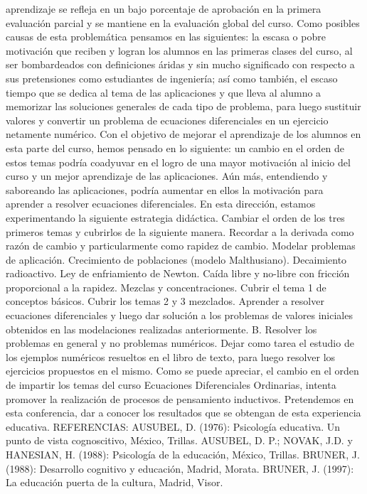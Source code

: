 aprendizaje se refleja en un bajo porcentaje de aprobación en la primera evaluación parcial y se mantiene en la evaluación global del curso. Como posibles causas de esta problemática pensamos en las siguientes: la escasa o pobre motivación que reciben y logran los alumnos en las primeras clases del curso, al ser bombardeados con definiciones áridas y sin mucho significado con respecto a sus pretensiones como estudiantes de ingeniería; así como también, el escaso tiempo que se dedica al tema de las aplicaciones y que lleva al alumno a memorizar las soluciones generales de cada tipo de problema, para luego sustituir valores y convertir un problema de ecuaciones diferenciales en un ejercicio netamente numérico. Con el objetivo de mejorar el aprendizaje de los alumnos en esta parte del curso, hemos pensado en lo siguiente: un cambio en el orden de estos temas podría coadyuvar en el logro de una mayor motivación al inicio del curso y un mejor aprendizaje de las aplicaciones. Aún más, entendiendo y saboreando las aplicaciones, podría aumentar en ellos la motivación para aprender a resolver ecuaciones diferenciales. En esta dirección, estamos experimentando la siguiente estrategia didáctica. Cambiar el orden de los tres primeros temas y cubrirlos de la siguiente manera.  Recordar a la derivada como razón de cambio y particularmente como rapidez de cambio. Modelar problemas de aplicación. Crecimiento de poblaciones (modelo Malthusiano). Decaimiento radioactivo. Ley de enfriamiento de Newton. Caída libre y no-libre con fricción proporcional a la rapidez. Mezclas y concentraciones. Cubrir el tema 1 de conceptos básicos. Cubrir los temas 2 y 3 mezclados. Aprender a resolver ecuaciones diferenciales y luego dar solución a los problemas de valores iniciales obtenidos en las modelaciones realizadas anteriormente. B. Resolver los problemas en general y no problemas numéricos. Dejar como tarea el estudio de los ejemplos numéricos resueltos en el libro de texto, para luego resolver los ejercicios propuestos en el mismo. Como se puede apreciar, el cambio en el orden de impartir los temas del curso Ecuaciones Diferenciales Ordinarias, intenta promover la realización de procesos de pensamiento inductivos. Pretendemos en esta conferencia, dar a conocer los resultados que se obtengan de esta experiencia educativa.   REFERENCIAS: AUSUBEL, D. (1976): Psicología educativa. Un punto de   vista cognoscitivo, México, Trillas. AUSUBEL, D. P.; NOVAK, J.D. y HANESIAN, H. (1988):   Psicología de la educación, México, Trillas. BRUNER, J. (1988): Desarrollo cognitivo y educación,   Madrid, Morata. BRUNER, J. (1997): La educación puerta de la cultura,   Madrid, Visor.
